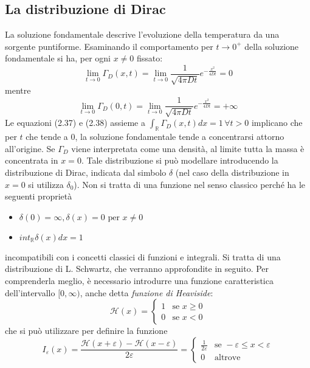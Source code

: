 \documentclass[a4paper,12pt, draft]{article}
\theoremstyle{break}
\let\epsilon\varepsilon
\numberwithin{equation}{section}
\begin{document}
\subsection{La distribuzione di Dirac}
La soluzione fondamentale descrive l'evoluzione della temperatura da una sorgente puntiforme. Esaminando il comportamento per \(t \to 0^+\) della soluzione fondamentale si ha, per ogni \(x \not = 0\) fissato:
\begin{equation}
\lim_{t \to 0}\Gamma_D (x,t) = \lim_{t \to 0} \frac{1}{\sqrt{4 \pi Dt}}e^{-\frac{x^2}{4Dt}} = 0
\end{equation}
mentre
\begin{equation}
  \lim_{t \to 0}\Gamma_D (0,t) = \lim_{t \to 0} \frac{1}{\sqrt{4 \pi Dt}}e^{-\frac{x^2}{4Dt}} = +\infty
\end{equation}
Le equazioni (2.37) e (2.38) assieme a \(\int_{\mathbb{R}}\Gamma_D(x,t)dx = 1 \, \forall t >0\) implicano che per $t$ che tende a \(0\), la soluzione fondamentale tende a concentrarsi attorno all'origine. Se \(\Gamma_D\) viene interpretata come una densità, al limite tutta la massa è concentrata in \(x=0\). Tale distribuzione si può modellare introducendo la distribuzione di Dirac, indicata dal simbolo \(\delta\) (nel caso della distribuzione in \(x = 0\) si utilizza \(\delta_0\)). Non si tratta di una funzione nel senso classico perché ha le seguenti proprietà
\begin{itemize}
  \item \(\delta (0) = \infty, \delta(x) = 0 \mbox{ per } x \not= 0\)
  \item \(int_{\mathbb{R}} \delta(x)dx = 1\)
\end{itemize} 
incompatibili con i concetti classici di funzioni e integrali. Si tratta di una distribuzione di L. Schwartz, che verranno approfondite in seguito. Per comprenderla meglio, è necessario introdurre una funzione caratteristica dell'intervallo \([0, \infty)\), anche detta \emph{funzione di Heaviside}:
\[
\mathcal{H}(x) = \begin{cases}
  1 &\mbox{se } x \geq 0 \\
  0 & \mbox{se } x < 0
\end{cases}  
\]
che si può utilizzare per definire la funzione
\[
I_{\epsilon}(x) = \frac{\mathcal{H}(x + \epsilon) - \mathcal{H}(x - \epsilon)}{2\epsilon} = \begin{cases}
  \frac{1}{2\epsilon} &\mbox{se } -\epsilon \leq x < \epsilon \\
  0 &\mbox{altrove}
\end{cases} 
\]
\end{document}
